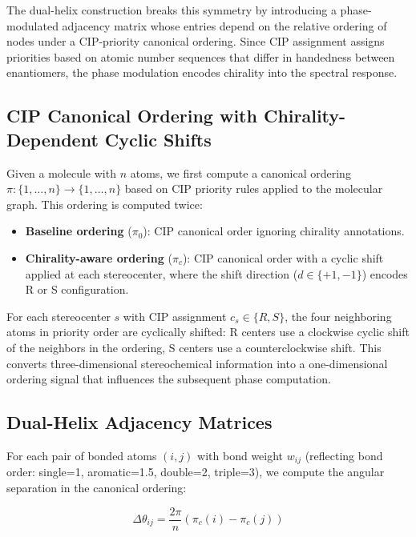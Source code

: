 \documentclass[11pt,a4paper]{article}
\begin{document}
The dual-helix construction breaks this symmetry by introducing a
phase-modulated adjacency matrix whose entries depend on the relative ordering
of nodes under a CIP-priority canonical ordering. Since CIP assignment assigns
priorities based on atomic number sequences that differ in handedness between
enantiomers, the phase modulation encodes chirality into the spectral response.

\subsection{CIP Canonical Ordering with Chirality-Dependent Cyclic Shifts}

Given a molecule with $n$ atoms, we first compute a canonical ordering
$\pi: \{1, \ldots, n\} \to \{1, \ldots, n\}$ based on CIP priority rules applied
to the molecular graph. This ordering is computed twice:
\begin{itemize}[leftmargin=1.5em]
  \item \textbf{Baseline ordering} ($\pi_0$): CIP canonical order ignoring
    chirality annotations.
  \item \textbf{Chirality-aware ordering} ($\pi_c$): CIP canonical order with
    a cyclic shift applied at each stereocenter, where the shift direction
    ($d \in \{+1, -1\}$) encodes R or S configuration.
\end{itemize}

For each stereocenter $s$ with CIP assignment $c_s \in \{R, S\}$, the four
neighboring atoms in priority order are cyclically shifted: R centers use a
clockwise cyclic shift of the neighbors in the ordering, S centers use a
counterclockwise shift. This converts three-dimensional stereochemical
information into a one-dimensional ordering signal that influences the subsequent
phase computation.

\subsection{Dual-Helix Adjacency Matrices}

For each pair of bonded atoms $(i, j)$ with bond weight $w_{ij}$ (reflecting bond
order: single=1, aromatic=1.5, double=2, triple=3), we compute the angular
separation in the canonical ordering:

\begin{equation}
  \Delta\theta_{ij} = \frac{2\pi}{n} \left(\pi_c(i) - \pi_c(j)\right)
\end{equation}
\end{document}
